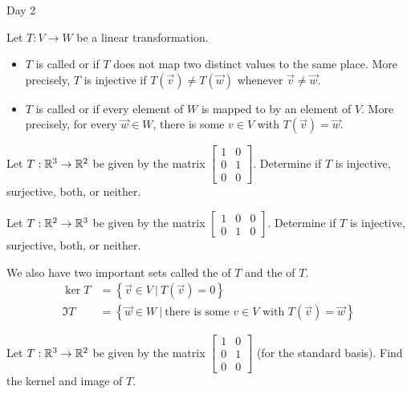 \documentclass{article}[12pt]
\begin{document}
\begin{applicationActivities}{Day 2}

\begin{definition}
Let $T: V \rightarrow W$ be a linear transformation.
\begin{itemize}
\item $T$ is called  or  if $T$ does not map two distinct values to the same place.  More precisely, $T$ is injective if $T(\vec{v}) \neq T(\vec{w})$ whenever $\vec{v} \neq \vec{w}$.
\item $T$ is called  or  if every element of $W$ is mapped to by an element of $V$.  More precisely, for every $\vec{w} \in W$, there is some $v \in V$ with $T(\vec{v})=\vec{w}$.
\end{itemize}
\end{definition}

\begin{activity}
Let $T: \mathbb{R}^3 \rightarrow \mathbb{R}^2$ be given by the matrix $\begin{bmatrix} 1 & 0 \\ 0 & 1 \\ 0 & 0 \end{bmatrix}$.  Determine if $T$ is injective, surjective, both, or neither.
\end{activity}

\begin{activity}
Let $T: \mathbb{R}^2 \rightarrow \mathbb{R}^3$ be given by the matrix $\begin{bmatrix} 1 & 0 &0  \\ 0 & 1 & 0 \end{bmatrix}$.  Determine if $T$ is injective, surjective, both, or neither.
\end{activity}

\begin{definition}
We also have two important sets called the  of $T$ and the  of $T$.
\begin{align*}
\ker T &= \left\{ \vec{v} \in V\ \big|\ T(\vec{v})=0\right\} \\
\Im T &= \left\{ \vec{w} \in W\ \big|\ \text{there is some }v\in V \text{ with } T(\vec{v})=\vec{w}\right\}
\end{align*}
\end{definition}

\begin{activity}
Let $T: \mathbb{R}^3 \rightarrow \mathbb{R}^2$ be given by the matrix $\begin{bmatrix} 1 & 0 \\ 0 & 1 \\ 0 & 0 \end{bmatrix}$ (for the standard basis).  Find the kernel and image of $T$.
\end{activity}


\end{applicationActivities}
\end{document}

